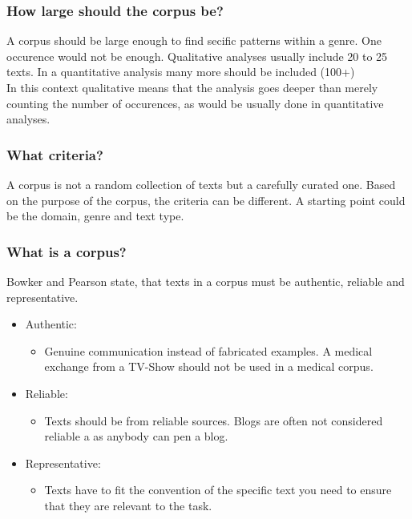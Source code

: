 \documentclass{article}
\begin{document}
	\subsubsection{How large should the corpus be?}
	A corpus should be large enough to find secific patterns within a genre. One occurence would not be enough. Qualitative analyses usually include 20 to 25 texts. In a quantitative analysis many more should be included (100+) \\
	In this context qualitative means that the analysis goes deeper than merely counting the number of occurences, as would be usually done in quantitative analyses. \\
	\subsubsection{What criteria?}
	A corpus is not a random collection of texts but a carefully curated one. Based on the purpose of the corpus, the criteria can be different. A starting point could be the domain, genre and text type.
	\subsubsection{What is a corpus?}
	Bowker and Pearson state, that texts in a corpus must be authentic, reliable and representative. \\
	\begin{itemize}
		\item{Authentic:}
		\begin{itemize}
			\item{Genuine communication instead of fabricated examples. A medical exchange from a TV-Show should not be used in a medical corpus.}
		\end{itemize}
		\item{Reliable:}
		\begin{itemize}
			\item{Texts should be from reliable sources. Blogs are often not considered reliable a as anybody can pen a blog.}
		\end{itemize}
		\item{Representative:}
		\begin{itemize}
			\item{Texts have to fit the convention of the specific text you need to ensure that they are relevant to the task.}
		\end{itemize}
	\end{itemize}
\end{document}
